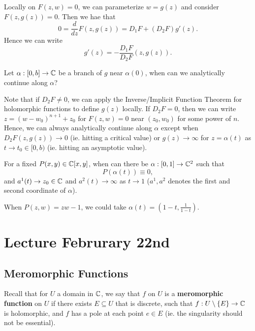 \documentclass{article}
\begin{document}
{Locally on $F(z, w) = 0$, we can parameterize $w = g(z)$ and consider $F(z, g(z)) = 0$. Then we hae that
\[0 = \frac{d}{dz} F(z, g(z)) = D_1 F + (D_2 F) g'(z).\]
Hence we can write
\[g'(z) = -\frac{D_1 F}{D_2 F}(z, g(z)).\]

\begin{question}
    Let $\alpha: [0, b] \to \mathbb{C}$ be a branch of $g$ near $\alpha(0)$, when can we analytically continue along $\alpha$?
\end{question}

Note that if $D_2 F \neq 0$, we can apply the Inverse/Implicit Function Theorem for holomorphic functions to define $g(z)$ locally. If $D_2 F = 0$, then we can write $z = (w - w_0)^{n+1} + z_0$ for $F(z, w) = 0$ near $(z_0, w_0)$ for some power of $n$. \\

Hence, we can always analytically continue along $\alpha$ except when $D_2 F(z, g(z)) \to 0$ (ie. hitting a critical value) or $g(z) \to \infty$ for $z = \alpha(t)$ as $t \to t_0 \in [0, b)$ (ie. hitting an asymptotic value).

\begin{exercise}
    For a fixed $P(x, y) \in \mathbb{C}[x, y]$, when can there be $\alpha: [0, 1] \to \mathbb{C}^2$ such that
    \[P(\alpha(t)) \equiv 0, \]
    and $a^1(t) \to z_0 \in \mathbb{C}$ and $a^2(t) \to \infty$ as $t \to 1$ ($a^1, a^2$ denotes the first and second coordinate of $\alpha$).
\end{exercise}

\begin{example}
    When $P(z, w) = zw - 1$, we could take $\alpha(t) = (1-t, \frac{1}{1-t})$.
\end{example}



\newpage
\section{Lecture Februrary 22nd}

\subsection{Meromorphic Functions}

Recall that for $U$ a domain in $\mathbb{C}$, we say that $f$ on $U$ is a \textbf{meromorphic function} on $U$ if there exists $E \subseteq U$ that is discrete, such that $f: U \setminus \{E\} \to \mathbb{C}$ is holomorphic, and $f$ has a pole at each point $e \in E$ (ie. the singularity should not be essential).\\

}
\end{document}
